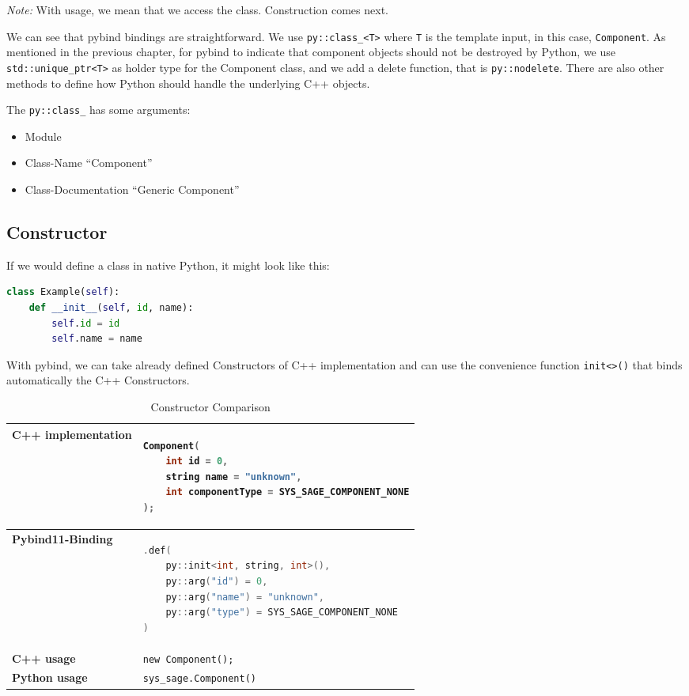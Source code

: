 \textit{Note:} With usage, we mean that we access the class. Construction comes next.

\smallskip
We can see that pybind bindings are straightforward. We use \verb|py::class_<T>| where \verb|T| is the template input, in this case, \verb|Component|. As mentioned in the previous chapter, for pybind to indicate that component objects should not be destroyed by Python, we use \verb|std::unique_ptr<T>| as holder type for the Component class, and we add a delete function, that is \verb|py::nodelete|. There are also other methods to define how Python should handle the underlying C++ objects.

The \verb|py::class_| has some arguments:

\begin{itemize}
    \item Module
    \item Class-Name “Component”
    \item Class-Documentation “Generic Component”
\end{itemize}


\subsection{Constructor}

If we would define a class in native Python, it might look like this:

\begin{lstlisting}[language=Python, xleftmargin=4em]
class Example(self):
    def __init__(self, id, name):
        self.id = id
        self.name = name
\end{lstlisting}

With pybind, we can take already defined Constructors of C++ implementation and can use the convenience function \verb|init<>()| that binds automatically the C++ Constructors.

\begin{table}[htbp]
\centering
\begin{tabular}{|l|l|}
\hline
\textbf{C++ implementation} &
\begin{lstlisting}[language=C++]
Component(
    int id = 0,
    string name = "unknown",
    int componentType = SYS_SAGE_COMPONENT_NONE
);
\end{lstlisting}
\\ \hline
\textbf{Pybind11-Binding} &
\begin{lstlisting}[language=C++]
.def(
    py::init<int, string, int>(),
    py::arg("id") = 0,
    py::arg("name") = "unknown",
    py::arg("type") = SYS_SAGE_COMPONENT_NONE
)
\end{lstlisting}
\\ \hline
\textbf{C++ usage} &
\verb|new Component();| \\ \hline
\textbf{Python usage} &
\verb|sys_sage.Component()| \\ \hline
\end{tabular}
\caption{Constructor Comparison}
\label{tab:constructor}
\end{table}

